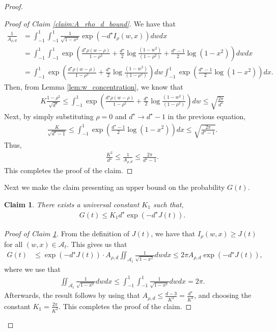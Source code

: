 \documentclass[12pt]{article}
\newtheorem{claim}[theorem]{Claim}
\theoremstyle{definition}
\theoremstyle{remark}
\begin{document}
\begin{proof}
\begin{proof}[Proof of Claim \ref{claim:A_rho_d_bound}]
We have that
\begin{align*}
    \frac{1}{A_{\rho, d}} &= \int_{-1}^1 \int_{-1}^1 \frac{1}{\sqrt{1-x^2}} \exp\left(-d^{\star} I_{\rho}(w,x)\right)dw dx\\
    & = \int_{-1}^1 \int_{-1}^1  \exp\left(\frac{d^{\star} \rho(w - \rho)}{1-\rho^2} + \frac{d^{\star}}{2} \log\frac{(1-w^2)}{(1-\rho^2)} + \frac{d^{\star}-1}{2} \log(1-x^2) \right)dw dx\\
    & = \int_{-1}^1  \exp\left(\frac{d^{\star} \rho(w-\rho)}{1-\rho^2} + \frac{d^{\star}}{2} \log\frac{(1-w^2)}{(1-\rho^2)} \right)dw \int_{-1}^1   \exp\left( \frac{d^{\star}-1}{2} \log(1-x^2) \right)dx.
\end{align*}
Then, from Lemma \ref{lem:w_concentration}, we know that
\begin{align*}
   K \frac{1-\rho^2}{\sqrt{d^\star}}\leq \int_{-1}^1  \exp\left(\frac{d^{\star} \rho(w-\rho)}{1-\rho^2} + \frac{d^{\star}}{2} \log\frac{(1-w^2)}{(1-\rho^2)} \right)dw \leq \sqrt{\frac{2\pi}{d^\star}}
\end{align*}
Next, by simply substituting $\rho=0$ and $d^{\star} \rightarrow d^{\star}-1$ in the previous equation,
\begin{align*}
   \frac{K}{\sqrt{d^\star-1}} \leq  \int_{-1}^1   \exp\left( \frac{d^{\star}-1}{2} \log(1-x^2) \right)dx \leq \sqrt{\frac{2\pi}{d^\star -1}}.
\end{align*}
Thus,
\begin{align*}
   \frac{K^2}{d^\star} \leq \frac{1}{A_{\rho, d}} \leq \frac{2\pi}{ d^\star -1}.
\end{align*}
This completes the proof of the claim.
\end{proof}

Next we make the claim presenting an upper bound on the probability $G(t)$.
\begin{claim}
\label{claim:g_upper_bound}
There exists a universal constant $K_1$ such that,
\begin{align*}
    G(t) \leq K_1 d^{\star} \exp\left(-d^{\star} J(t)\right).
\end{align*}
\end{claim}

\begin{proof}[Proof of Claim \ref{claim:g_upper_bound}]
From the definition of $J(t)$, we have that $I_\rho(w,x)\geq J(t)$ for all $(w,x) \in \mathcal{A}_t$. This gives us that
\begin{align*}
G(t) &\leq \exp\left(-d^{\star} J(t)\right) \cdot A_{\rho, d} \iint_{\mathcal{A}_t} \frac{1}{\sqrt{1-x^2}} dw dx \leq 2\pi A_{\rho, d}\exp \left(-d^{\star} J(t)\right),
\end{align*}
where we use that
\begin{align*}
    \iint_{\mathcal{A}_t} \frac{1}{\sqrt{1-x^2}} dw dx \leq \int_{-1}^1 \int_{-1}^1 \frac{1}{\sqrt{1-x^2}} dw dx = 2\pi.
\end{align*}
Afterwards, the result follows by using that $A_{\rho, d} \leq \frac{d-3}{K^2} = \frac{d^{\star}}{K^2}$, and choosing the constant $K_1 = \frac{2\pi}{K^2}$. This completes the proof of the claim.
\end{proof}


\end{proof}
\end{document}
